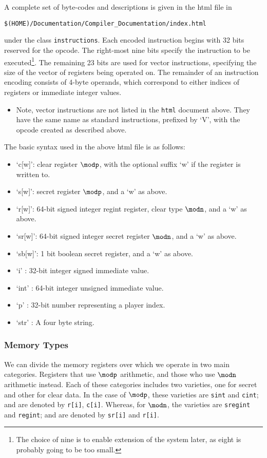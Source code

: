 A complete set of byte-codes and descriptions is
given in the html file in 
\begin{center}
   \verb+$(HOME)/Documentation/Compiler_Documentation/index.html+
\end{center}
under the class \verb+instructions+.
Each encoded instruction begins with 32 bits reserved for the opcode.
The right-most nine bits specify the instruction to be executed\footnote{The choice of nine is to enable extension of the system later, as eight is probably going 
to be too small.}.
The remaining 23 bits are used for vector instructions, specifying the
size of the vector of registers being operated on.
The remainder of an instruction encoding consists of 4-byte operands, which
correspond to either indices of registers or immediate integer values.
\begin{itemize}
\item Note, vector instructions are not listed in the \verb+html+ document above.
They have the same name as standard instructions, prefixed by `V',
with the opcode created as described above.
\end{itemize}
The basic syntax used in the above html file is as follows:
\begin{itemize}
\item `c[w]': clear register $\modp$, with the optional suffix `w' if the register is
written to.
\item `s[w]': secret register $\modp$, and a `w' as above.
\item `r[w]': 64-bit signed integer regint register, clear type $\modn$, and a `w' as above.
\item `sr[w]': 64-bit signed integer secret register $\modn$, and a `w' as above.
\item `sb[w]': 1 bit boolean secret register, and a `w' as above.
\item `i'   : 32-bit integer signed immediate value.
\item `int' : 64-bit integer unsigned immediate value.
\item `p'   : 32-bit number representing a player index.
\item `str' : A four byte string.


\end{itemize}


\subsubsection{Memory Types}

We can divide the memory registers over which we operate in two main categories. Registers that use $\modp$ arithmetic, and those who use $\modn$ arithmetic instead. 
Each of these categories includes two varieties, one for secret and other for clear data. 
In the case of $\modp$, these varieties are \verb+sint+ and \verb+cint+; and are denoted by \verb+r[i]+, \verb+c[i]+. Whereas, for $\modn$, the varieties are \verb+sregint+ and
\verb+regint+; and are denoted by \verb+sr[i]+ and \verb+r[i]+.

